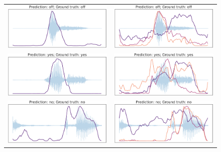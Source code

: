 \begin{figure}[h!]
	\centering
	\begin{tabular}{cc}
		\includegraphics[width = 0.45\linewidth]{imgs/att_scores12_23_andreade.pdf} &
		\includegraphics[width = 0.45\linewidth]{imgs/att_scores12_23.pdf}\\
		\includegraphics[width = 0.45\linewidth]{imgs/att_scores12_42_andreade.pdf} &
		\includegraphics[width = 0.45\linewidth]{imgs/att_scores12_42.pdf}\\
		\includegraphics[width = 0.45\linewidth]{imgs/att_scores12_72_andreade.pdf} &
		\includegraphics[width = 0.45\linewidth]{imgs/att_scores12_72.pdf}
	\end{tabular}

\end{figure}
